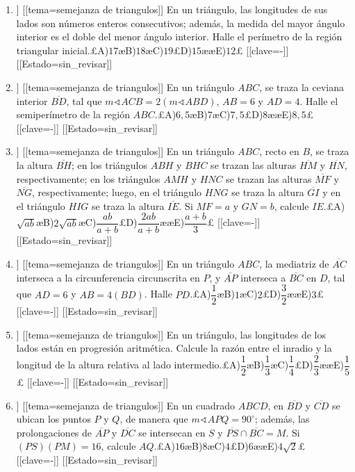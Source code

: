 \begin{enumerate}
\item[\textbf{13.}] [[curso=Geometria]] [[tema=semejanza de triangulos]] En un triángulo, las longitudes de sus lados son números enteros consecutivos; además, la medida del mayor ángulo interior es el doble del menor ángulo interior. Halle el perímetro de la región triangular inicial.£A)$17$æB)$18$æC)$19$£D)$15$ææE)$12$£ [[clave=-]] [[Estado=sin_revisar]]
\item[\textbf{14.}] [[curso=Geometria]] [[tema=semejanza de triangulos]] En un triángulo $ABC$, se traza la ceviana interior $\overline{BD}$, tal que $m\sphericalangle ACB=2(m\sphericalangle ABD)$, $AB=6$ y $AD=4$. Halle el semiperímetro de la región $ABC$.£A)$6,5$æB)$7$æC)$7,5$£D)$8$ææE)$8,5$£ [[clave=-]] [[Estado=sin_revisar]]
\item[\textbf{15.}] [[curso=Geometria]] [[tema=semejanza de triangulos]] En un triángulo $ABC$, recto en $B$, se traza la altura $\overline{BH}$; en los triángulos $ABH$ y $BHC$ se trazan las alturas $\overline{HM}$ y $\overline{HN}$, respectivamente; en los triángulos $AMH$ y $HNC$ se trazan las alturas $\overline{MF}$ y $\overline{NG}$, respectivamente; luego, en el triángulo $HNG$ se traza la altura $\overline{GI}$ y en el triángulo $HIG$ se traza la altura $\overline{IE}$. Si $MF=a$ y $GN=b$, calcule $IE$.£A)$\sqrt{ab}$æB)$2\sqrt{ab}$æC)$\dfrac{ab}{a+b}$£D)$\dfrac{2ab}{a+b}$ææE)$\dfrac{a+b}{3}$£ [[clave=-]] [[Estado=sin_revisar]]
\item[\textbf{16.}] [[curso=Geometria]] [[tema=semejanza de triangulos]] En un triángulo $ABC$, la mediatriz de $\overline{AC}$ interseca a la circunferencia circunscrita en $P$, y $\overline{AP}$ interseca a $\overline{BC}$ en $D$, tal que $AD=6$ y $AB=4(BD)$. Halle $PD$.£A)$\dfrac{1}{2}$æB)$1$æC)$2$£D)$\dfrac{3}{2}$ææE)$3$£ [[clave=-]] [[Estado=sin_revisar]]
\item[\textbf{17.}] [[curso=Geometria]] [[tema=semejanza de triangulos]] En un triángulo, las longitudes de los lados están en progresión aritmética. Calcule la razón entre el inradio y la longitud de la altura relativa al lado intermedio.£A)$\dfrac{1}{2}$æB)$\dfrac{1}{3}$æC)$\dfrac{1}{4}$£D)$\dfrac{2}{3}$ææE)$\dfrac{1}{5}$£ [[clave=-]] [[Estado=sin_revisar]]
\item[\textbf{18.}] [[curso=Geometria]] [[tema=semejanza de triangulos]] En un cuadrado $ABCD$, en $\overline{BD}$ y $\overline{CD}$ se ubican los puntos $P$ y $Q$, de manera que $m\sphericalangle APQ=90^\circ$; además, las prolongaciones de $\overline{AP}$ y $\overline{DC}$ se intersecan en $S$ y $\overline{PS}\cap\overline{BC}={M}$. Si $(PS)(PM)=16$, calcule $AQ$.£A)$16$æB)$8$æC)$4$£D)$6$ææE)$4\sqrt{2}$£ [[clave=-]] [[Estado=sin_revisar]]

\end{enumerate}
